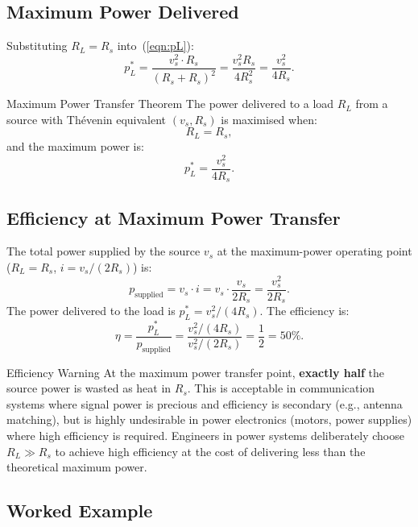 \documentclass[twoside]{article}
\begin{document}
\subsection{Maximum Power Delivered}

Substituting $R_L = R_s$ into~(\ref{eqn:pL}):
\[
    p_L^{*} = \frac{v_s^2 \cdot R_s}{(R_s + R_s)^2}
            = \frac{v_s^2 R_s}{4 R_s^2}
            = \frac{v_s^2}{4 R_s}.
\]

\begin{cyanbox}{Maximum Power Transfer Theorem}
The power delivered to a load $R_L$ from a source with Th\'{e}venin equivalent $(v_s, R_s)$ is maximised when:
\[
    R_L = R_s,
\]
and the maximum power is:
\[
    p_L^{*} = \frac{v_s^2}{4R_s}.
\]
\end{cyanbox}

\subsection{Efficiency at Maximum Power Transfer}

The total power supplied by the source $v_s$ at the maximum-power operating point ($R_L = R_s$, $i = v_s/(2R_s)$) is:
\[
    p_{\text{supplied}} = v_s \cdot i = v_s \cdot \frac{v_s}{2R_s} = \frac{v_s^2}{2R_s}.
\]
The power delivered to the load is $p_L^{*} = v_s^2/(4R_s)$.  The efficiency is:
\[
    \eta = \frac{p_L^{*}}{p_{\text{supplied}}} = \frac{v_s^2/(4R_s)}{v_s^2/(2R_s)} = \frac{1}{2} = 50\%.
\]

\begin{redbox}{Efficiency Warning}
At the maximum power transfer point, \textbf{exactly half} the source power is wasted as heat in $R_s$.  This is acceptable in communication systems where signal power is precious and efficiency is secondary (e.g., antenna matching), but is highly undesirable in power electronics (motors, power supplies) where high efficiency is required.  Engineers in power systems deliberately choose $R_L \gg R_s$ to achieve high efficiency at the cost of delivering less than the theoretical maximum power.
\end{redbox}

\subsection{Worked Example}
\end{document}
